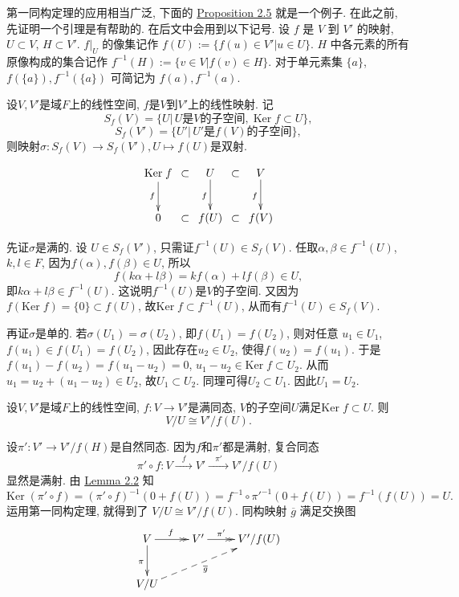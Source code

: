 \documentclass[color=green,mathpazo,titlestyle=hang]{elegantbook}
\begin{document}
第一同构定理的应用相当广泛, 下面的 \hyperlink{Proposition 2.5}{Proposition 2.5} 就是一个例子. 在此之前, 先证明一个引理是有帮助的. 在后文中会用到以下记号. 设 $f$ 是 $V$ 到 $V'$ 的映射, $U\subset V$, $H\subset V'$. $f|_U$ 的像集记作 $f(U):=\{f(u)\in V'|u\in U\}$. $H$ 中各元素的所有原像构成的集合记作 $f^{-1}(H):=\{v\in V|f(v)\in H\}$. 对于单元素集 $\{a\}$, $f(\{a\}),f^{-1}(\{a\})$ 可简记为 $f(a),f^{-1}(a)$.

\hypertarget{Lemma 2.2}{}
\begin{newlemma}
	设$V,V'$是域$F$上的线性空间, $f$是$V$到$V'$上的线性映射. 记
	\[
	S_f(V)=\{U|\,U\text{是}V\text{的子空间},\;\mathrm{Ker}\;f\subset U\},	
	\]	
	\[
	S_f(V')=\{U'|\,U'\text{是}f(V)\text{的子空间}\},
	\]
	则映射$\sigma:S_f(V)\rightarrow S_f(V'),U\mapsto f(U)$是双射.
\end{newlemma}

\hypertarget{Proposition 2.5}{}
\begin{newproof}
    \[\xymatrix@C=1.8pt{
    	\mathrm{Ker}\;f\ar[d]_{f} & \subset & U\ar[d]_{f} & \subset & V\ar[d]_{f} \\
    	0 & \subset & f(U) & \subset & f(V) 
    }\]		
	
先证$\sigma$是满的. 设 $U\in S_f(V')$, 只需证$f^{-1}(U)\in S_f(V)$. 任取$\alpha,\beta\in f^{-1}(U)$, $k,l\in F$, 因为$f(\alpha),f(\beta)\in U$, 所以
\[
f(k\alpha+l\beta)=kf(\alpha)+lf(\beta)\in U,
\]
即$k\alpha+l\beta\in f^{-1}(U)$. 这说明$f^{-1}(U)$是$V$的子空间. 又因为$f(\mathrm{Ker}\;f)=\{0\}\subset f(U)$, 故$\mathrm{Ker}\;f\subset f^{-1}(U)$, 从而有$f^{-1}(U)\in S_f(V)$.\par
再证$\sigma$是单的. 若$\sigma(U_1)=\sigma(U_2)$, 即$f(U_1)=f(U_2)$, 则对任意 $u_1\in U_1$, $f(u_1)\in f(U_1)=f(U_2)$, 因此存在$u_2\in U_2$, 使得$f(u_2)=f(u_1)$. 于是$f(u_1)-f(u_2)=f(u_1-u_2)=0$,  $u_1-u_2\in\mathrm{Ker}\;f\subset U_2$. 从而$u_1=u_2+(u_1-u_2)\in U_2$,  故$U_1\subset U_2$. 同理可得$U_2\subset U_1$. 因此$U_1=U_2$.	
	
\end{newproof}	

\begin{newprop}
	设$V,V'$是域$F$上的线性空间, $f:V\longrightarrow V'$是满同态,  $V$的子空间$U$满足$\mathrm{Ker}\;f\subset U$. 则
	\[
	V/U\cong V'/f(U).
	\]
\end{newprop}

\begin{newproof}
	设$\pi':V'\rightarrow V'/f(H)$是自然同态. 因为$f$和$\pi'$都是满射, 复合同态
	\[ \pi'\circ f:V\xrightarrow{\;\;\; f\;\;\;}V'\xrightarrow{\;\;\;\pi'\;\;\;}V'/f(U)
	\]
	显然是满射. 由 \hyperlink{Lemma 2.2}{Lemma 2.2} 知 
	\[
	\mathrm{Ker}\;(\pi'\circ f)=(\pi'\circ f)^{-1}(0+f(U))= f^{-1}\circ\pi'^{-1}(0+f(U))=f^{-1}(f(U))=U.
	\]
	运用第一同构定理, 就得到了 $V/U\cong V'/f(U)$. 同构映射 $\overline{g}$ 满足交换图
	\[\xymatrix{
		V\ar[d]_{\pi}\ar@{>>}[r]^{f\ } & V'\ar@{>>}[r]^{\pi'\ \quad} & V'/f(U)\\
		V/U \ar@{-->}[urr]_{\overline{g}} &  
	}\]
\end{newproof}
\end{document}
